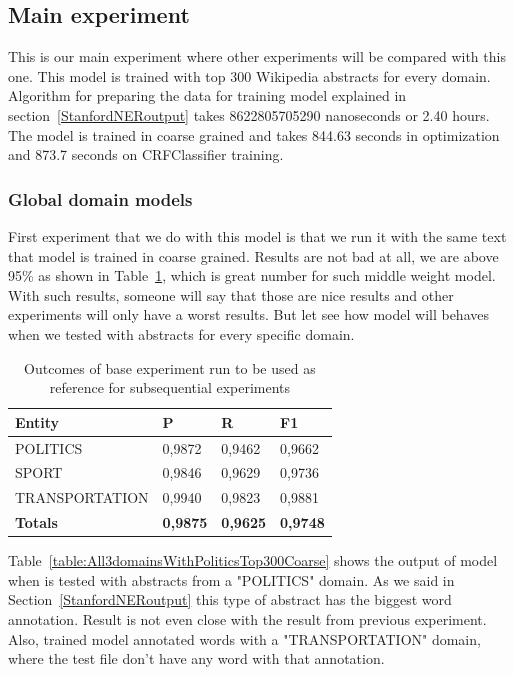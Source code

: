 \documentclass[thesis=M,english]{FITthesis}[2018/05/30]
\begin{document}
\subsection{Main experiment}\label{MainExperiment}
This is our main experiment where other experiments will be compared with this one. This model is trained with top 300 Wikipedia abstracts for every domain. Algorithm for preparing the data for training model explained in section~\ref{StanfordNERoutput}  takes 8622805705290 nanoseconds or 2.40 hours. The model is trained in coarse grained and takes 844.63 seconds in optimization and 873.7 seconds on CRFClassifier training.

\subsubsection{Global domain models}
	First experiment that we do with this model is that we run it with the same text that model is trained in coarse grained. Results are not bad at all, we are above 95\% as shown in Table~\ref{table:All3domainsWithAll3DomiansTop300Coarse}, which is great number for such middle weight model. With such results, someone will say that those are nice results and other experiments will only have a worst results. But let see how model will behaves when we tested with abstracts for every specific domain.

	\begin{table}[H]\centering
		\begin{tabular}{|l|l|l|l|}
			\hline {\textbf{Entity}} & {\textbf{P}} & {\textbf{R}} & {\textbf{F1}}\\\hline
				POLITICS & 0,9872 & 0,9462 & 0,9662\\
				SPORT & 0,9846 & 0,9629 & 0,9736\\
				TRANSPORTATION & 0,9940 & 0,9823 & 0,9881\\\hline
				\textbf{Totals} & \textbf{0,9875} & \textbf{0,9625} & \textbf{0,9748}\\\hline
		\end{tabular}
		\caption{Outcomes of base experiment run to be used as reference for subsequential experiments \label{table:All3domainsWithAll3DomiansTop300Coarse}}
	\end{table}	
	
	Table~\ref{table:All3domainsWithPoliticsTop300Coarse} shows the output of model when is tested with abstracts from a "POLITICS" domain. As we said in Section~\ref{StanfordNERoutput} this type of abstract has the biggest word annotation. Result is not even close with the result from previous experiment. Also, trained model annotated words with a "TRANSPORTATION" domain, where the test file don't have any word with that annotation. 
	
\end{document}
